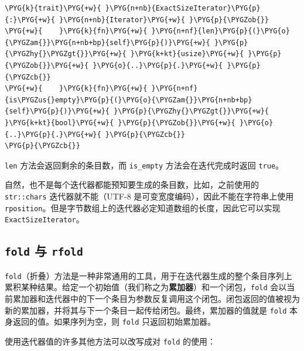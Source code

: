 \begin{Verbatim}[commandchars=\\\{\},breaklines=true,breakanywhere=true,fontsize=\codefont,xleftmargin=17bp]
\PYG{k}{trait}\PYG{+w}{ }\PYG{n+nb}{ExactSizeIterator}\PYG{p}{:}\PYG{+w}{ }\PYG{n+nb}{Iterator}\PYG{+w}{ }\PYG{p}{\PYGZob{}}
\PYG{+w}{    }\PYG{k}{fn}\PYG{+w}{ }\PYG{n+nf}{len}\PYG{p}{(}\PYG{o}{\PYGZam{}}\PYG{n+nb+bp}{self}\PYG{p}{)}\PYG{+w}{ }\PYG{p}{\PYGZhy{}\PYGZgt{}}\PYG{+w}{ }\PYG{k+kt}{usize}\PYG{+w}{ }\PYG{p}{\PYGZob{}}\PYG{+w}{ }\PYG{o}{..}\PYG{p}{.}\PYG{+w}{ }\PYG{p}{\PYGZcb{}}
\PYG{+w}{    }\PYG{k}{fn}\PYG{+w}{ }\PYG{n+nf}{is\PYGZus{}empty}\PYG{p}{(}\PYG{o}{\PYGZam{}}\PYG{n+nb+bp}{self}\PYG{p}{)}\PYG{+w}{ }\PYG{p}{\PYGZhy{}\PYGZgt{}}\PYG{+w}{ }\PYG{k+kt}{bool}\PYG{+w}{ }\PYG{p}{\PYGZob{}}\PYG{+w}{ }\PYG{o}{..}\PYG{p}{.}\PYG{+w}{ }\PYG{p}{\PYGZcb{}}
\PYG{p}{\PYGZcb{}}
\end{Verbatim}

\texttt{len} 方法会返回剩余的条目数，而 \texttt{is\_empty} 方法会在迭代完成时返回 \texttt{true}。

自然，也不是每个迭代器都能预知要生成的条目数，比如，之前使用的 \texttt{str::chars} 迭代器就不能（UTF-8 是可变宽度编码），因此不能在字符串上使用 \texttt{rposition}。但是字节数组上的迭代器必定知道数组的长度，因此它可以实现 \texttt{ExactSizeIterator}。

\subsection{\texttt{fold} 与 \texttt{rfold}}

\texttt{fold}（折叠）方法是一种非常通用的工具，用于在迭代器生成的整个条目序列上累积某种结果。给定一个初始值（我们称之为\textbf{累加器}）和一个闭包，\texttt{fold} 会以当前累加器和迭代器中的下一个条目为参数反复调用这个闭包。闭包返回的值被视为新的累加器，并将其与下一个条目一起传给闭包。最终，累加器的值就是 \texttt{fold} 本身返回的值。如果序列为空，则 \texttt{fold} 只返回初始累加器。

使用迭代器值的许多其他方法可以改写成对 \texttt{fold} 的使用：


